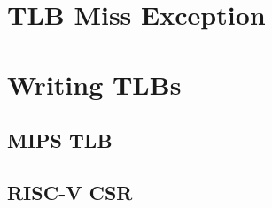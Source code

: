 



\section{TLB Miss Exception}









\section{Writing TLBs}
%

\subsection{MIPS TLB}

\subsection{RISC-V CSR}

